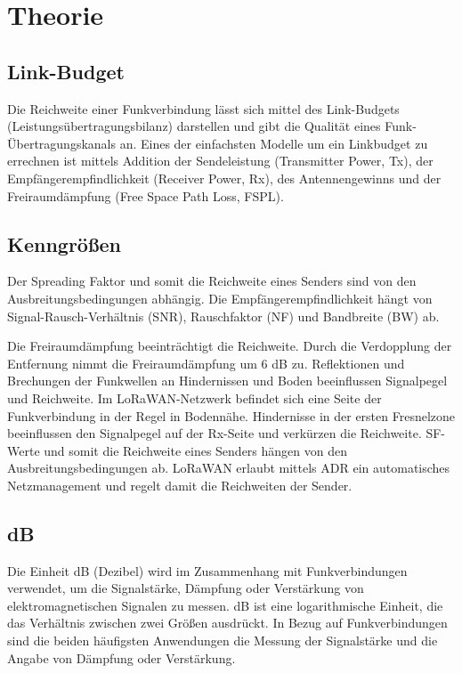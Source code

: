 \documentclass[12pt,a4paper]{article}
\begin{document}
\newpage
\section{Theorie}

\subsection{Link-Budget}

Die Reichweite einer Funkverbindung lässt sich mittel des Link-Budgets (Leistungsübertragungsbilanz) darstellen und gibt die Qualität eines Funk-Übertragungskanals an.
Eines der einfachsten Modelle um ein Linkbudget zu errechnen ist mittels Addition der Sendeleistung (Transmitter Power, Tx), der Empfängerempfindlichkeit (Receiver Power, Rx), des Antennengewinns und der Freiraumdämpfung (Free Space Path Loss, FSPL).

\subsection{Kenngrößen}

Der Spreading Faktor und somit die Reichweite eines Senders sind von den Ausbreitungsbedingungen abhängig.
Die Empfängerempfindlichkeit hängt von Signal-Rausch-Verhältnis (SNR), Rauschfaktor (NF) und Bandbreite (BW) ab.

Die Freiraumdämpfung beeinträchtigt die Reichweite. Durch die Verdopplung der Entfernung nimmt die Freiraumdämpfung um 6 dB zu.
Reflektionen und Brechungen der Funkwellen an Hindernissen und Boden beeinflussen Signalpegel und Reichweite. Im LoRaWAN-Netzwerk befindet sich eine Seite der Funkverbindung in der Regel in Bodennähe.
Hindernisse in der ersten Fresnelzone beeinflussen den Signalpegel auf der Rx-Seite und verkürzen die Reichweite.
SF-Werte und somit die Reichweite eines Senders hängen von den Ausbreitungsbedingungen ab. LoRaWAN erlaubt mittels ADR ein automatisches Netzmanagement und regelt damit die Reichweiten der Sender.

\subsection{dB}

Die Einheit dB (Dezibel) wird im Zusammenhang mit Funkverbindungen verwendet, um die Signalstärke, Dämpfung oder Verstärkung von elektromagnetischen Signalen zu messen. dB ist eine logarithmische Einheit, die das Verhältnis zwischen zwei Größen ausdrückt. In Bezug auf Funkverbindungen sind die beiden häufigsten Anwendungen die Messung der Signalstärke und die Angabe von Dämpfung oder Verstärkung.
\end{document}
